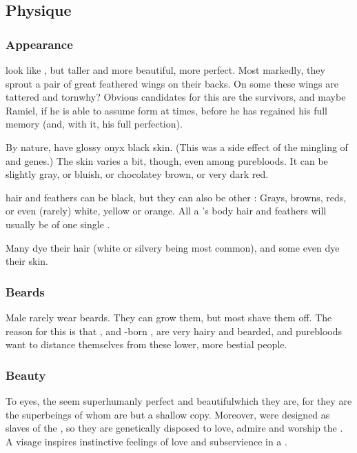 








\subsection{Physique}





\subsubsection{Appearance}
\Resphain{} look like \humans, but taller and more beautiful, more perfect. 
Most markedly, they sprout a pair of great feathered wings on their backs. 
On some \resphain{} these wings are tattered and torn\dash why? 
Obvious candidates for this are the \Kezeradi{} survivors, and maybe Ramiel, if he is able to assume \resphan{} form at times, before he has regained his full memory (and, with it, his full perfection). 

By nature, \resphain{} have glossy onyx black skin. 
(This was a side effect of the mingling of \SitraAchra and \nephilic{} genes.)
The skin \colour varies a bit, though, even among purebloods. 
It can be slightly gray, or bluish, or chocolatey brown, or very dark red.

\Resphan hair and feathers can be black, but they can also be other \colours: Grays, browns, reds, or even (rarely) white, yellow or orange.
All a \resphan's body hair and feathers will usually be of one single \colour.

Many dye their hair (white or silvery \colours being most common), and some even dye their skin. 





\subsubsection{Beards}
Male \resphain{} rarely wear beards. 
They can grow them, but most shave them off. 
The reason for this is that \nephilim{}, and \nephil-born , are very hairy and bearded, and purebloods want to distance themselves from these lower, more bestial people. 





\subsubsection{Beauty}
To \human{} eyes, the \resphain{} seem superhumanly perfect and beautiful\dash which they are, for they are the superbeings of whom \humans{} are but a shallow copy. 
Moreover, \humans{} were designed as slaves of the \resphain, so they are genetically disposed to love, admire and worship the \resphain. 
A \resphan{} visage inspires instinctive feelings of love and subservience in a \human. 

